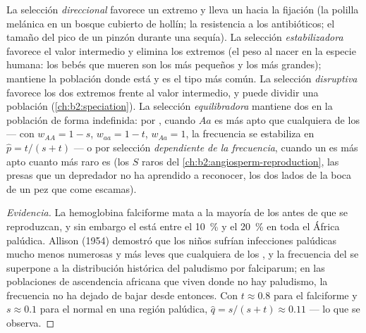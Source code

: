 \begin{proposition}\label{prop:b2:population-genetics:kinds}
La selección \emph{direccional} favorece un extremo y lleva un 
hacia la fijación (la polilla melánica en un bosque cubierto de hollín; la
resistencia a los antibióticos; el tamaño del pico de un pinzón durante
una sequía). La selección
\emph{estabilizadora} favorece el valor intermedio y elimina los extremos
(el peso al nacer en la especie humana: los bebés que mueren son los más
pequeños y los más grandes); mantiene la población donde está y es el tipo
más común. La selección \emph{disruptiva} favorece los dos extremos frente
al valor intermedio, y puede dividir una población
(\cref{ch:b2:speciation}). La selección \emph{equilibradora} mantiene dos
 en la población de forma indefinida: por \emph{}, cuando $Aa$ es más apto que cualquiera de los 
--- con
$w_{AA} = 1 - s$, $w_{aa} = 1 - t$, $w_{Aa} = 1$, la frecuencia se
estabiliza en $\hat p = t/(s + t)$ --- o por selección \emph{dependiente de
la frecuencia}, cuando un  es más apto cuanto más raro es (los
 $S$ raros del \cref{ch:b2:angiosperm-reproduction}, las presas que
un depredador no ha aprendido a reconocer, los dos lados de la boca de un
pez que come escamas).
\end{proposition}
\begin{proof}[Evidencia]
La hemoglobina falciforme mata a la mayoría de los  antes de
que se reproduzcan, y sin embargo el  está entre el \qty{10}{\%} y el
\qty{20}{\%} en toda el África palúdica. Allison (1954) demostró que los
niños  sufrían infecciones palúdicas mucho menos numerosas y
más leves que cualquiera de los , y la frecuencia del  se
superpone a la distribución histórica del paludismo por falciparum; en las
poblaciones de ascendencia africana que viven donde no hay paludismo, la
frecuencia no ha dejado de bajar desde entonces. Con $t \approx 0.8$ para
el  falciforme y $s \approx 0.1$ para el  normal en
una región palúdica,
$\hat q = s/(s + t) \approx 0.11$ --- lo que se observa.
\end{proof}

